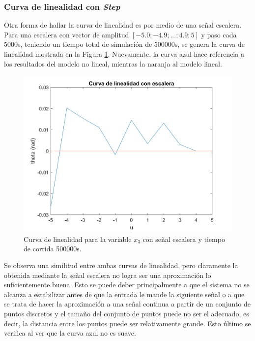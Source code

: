 \documentclass[journal]{IEEEtran}
\begin{document}
\subsubsection{Curva de linealidad con \textit{Step}}
Otra forma de hallar la curva de linealidad es por medio de una señal escalera. Para una escalera con vector de amplitud $[-5.0; -4.9;...;4.9;5]$ y paso cada 5000s, teniendo un tiempo total de simulación de 500000s, se genera la curva de linealidad mostrada en la Figura \ref{fig:curve_s}. Nuevamente, la curva azul hace referencia a los resultados del modelo no lineal, mientras la naranja al modelo lineal.\\

\begin{figure}[h!]
\caption{Curva de linealidad para la variable $x_3$ con señal escalera y tiempo de corrida 500000s.\label{fig:curve_s}}
  \centering
\includegraphics[scale=0.2]{curva_lin_esc.png}
\end{figure}
       
Se observa una similitud entre ambas curvas de linealidad, pero claramente la obtenida mediante la señal escalera no logra ser una aproximación lo suficientemente buena. Esto se puede deber principalmente a que el sistema no se alcanza a estabilizar antes de que la entrada le mande la siguiente señal o a que se trata de hacer la aproximación a una señal continua a partir de un conjunto de puntos discretos y el tamaño del conjunto de puntos puede no ser el adecuado, es decir, la distancia entre los puntos puede ser relativamente grande. Esto último se verifica al ver que la curva azul no es suave.
\end{document}
